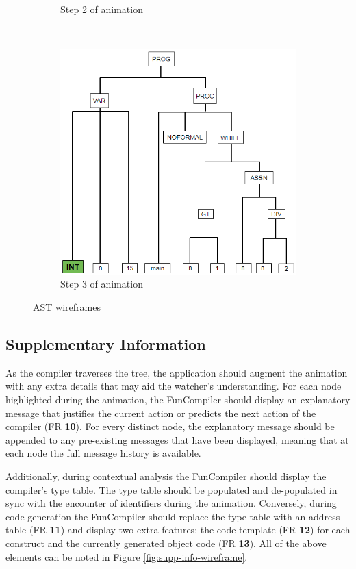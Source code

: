 \documentclass{l4proj}
\begin{document}
\begin{figure}[h]
\begin{subfigure}[b]{0.3\textwidth}
		\caption{Step 2 of animation}
		\label{fig:anim-step-2}
	\end{subfigure}	
	~
	\begin{subfigure}[b]{0.3\textwidth}
		\includegraphics[width=\linewidth]{images/animation-active-wireframe3.png}
		\caption{Step 3 of animation}
		\label{fig:anim-step-3}
	\end{subfigure}	
	\caption{AST wireframes}
	\label{fig:animation-active-wireframe}	
\end{figure}

\subsection{Supplementary Information}
As the compiler traverses the tree, the application should augment the animation with any extra details that may aid the watcher's understanding. For each node highlighted during the animation, the FunCompiler should display an explanatory message that justifies the current action or predicts the next action of the compiler (FR \textbf{10}). For every distinct node, the explanatory message should be appended to any pre-existing messages that have been displayed, meaning that at each node the full message history is available.

Additionally, during contextual analysis the FunCompiler should display the compiler's type table. The type table should be populated and de-populated in sync with the encounter of identifiers during the animation. Conversely, during code generation the FunCompiler should replace the type table with an address table  (FR \textbf{11}) and display two extra features: the code template (FR \textbf{12}) for each construct and the currently generated object code (FR \textbf{13}). All of the above elements can be noted in Figure \ref{fig:supp-info-wireframe}.
\end{document}
